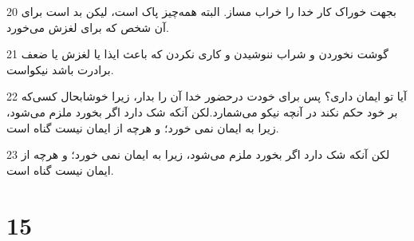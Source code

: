 \par 20 بجهت خوراک کار خدا را خراب مساز. البته همه‌چیز پاک است، لیکن بد است برای آن شخص که برای لغزش می‌خورد.
\par 21 گوشت نخوردن و شراب ننوشیدن و کاری نکردن که باعث ایذا یا لغزش یا ضعف برادرت باشد نیکواست.
\par 22 آیا تو ایمان داری؟ پس برای خودت درحضور خدا آن را بدار، زیرا خوشابحال کسی‌که بر خود حکم نکند در آنچه نیکو می‌شمارد.لکن آنکه شک دارد اگر بخورد ملزم می‌شود، زیرا به ایمان نمی خورد؛ و هر‌چه از ایمان نیست گناه است.
\par 23 لکن آنکه شک دارد اگر بخورد ملزم می‌شود، زیرا به ایمان نمی خورد؛ و هر‌چه از ایمان نیست گناه است.

\chapter{15}

